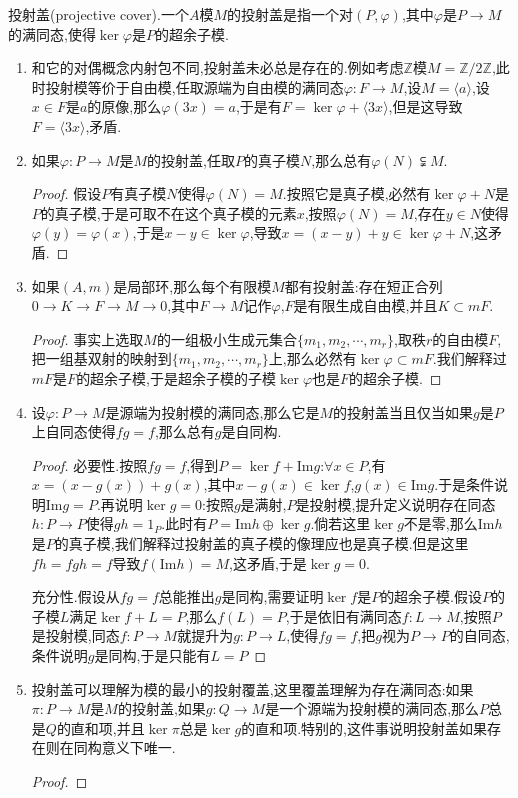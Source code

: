投射盖(projective cover).一个$A$模$M$的投射盖是指一个对$(P,\varphi)$,其中$\varphi$是$P\to M$的满同态,使得$\ker\varphi$是$P$的超余子模.
\begin{enumerate}
	\item 和它的对偶概念内射包不同,投射盖未必总是存在的.例如考虑$\mathbb{Z}$模$M=\mathbb{Z}/2\mathbb{Z}$,此时投射模等价于自由模,任取源端为自由模的满同态$\varphi:F\to M$,设$M=\langle a\rangle$,设$x\in F$是$a$的原像,那么$\varphi(3x)=a$,于是有$F=\ker\varphi+\langle 3x\rangle$,但是这导致$F=\langle 3x\rangle$,矛盾.
	\item 如果$\varphi:P\to M$是$M$的投射盖,任取$P$的真子模$N$,那么总有$\varphi(N)\subsetneqq M$.
	\begin{proof}
		
		假设$P$有真子模$N$使得$\varphi(N)=M$.按照它是真子模,必然有$\ker\varphi+N$是$P$的真子模,于是可取不在这个真子模的元素$x$,按照$\varphi(N)=M$,存在$y\in N$使得$\varphi(y)=\varphi(x)$,于是$x-y\in\ker\varphi$,导致$x=(x-y)+y\in\ker\varphi+N$,这矛盾.
	\end{proof}
	\item 如果$(A,m)$是局部环,那么每个有限模$M$都有投射盖:存在短正合列$0\to K\to F\to M\to0$,其中$F\to M$记作$\varphi$,$F$是有限生成自由模,并且$K\subset mF$.
	\begin{proof}
		
		事实上选取$M$的一组极小生成元集合$\{m_1,m_2,\cdots,m_r\}$,取秩$r$的自由模$F$,把一组基双射的映射到$\{m_1,m_2,\cdots,m_r\}$上,那么必然有$\ker\varphi\subset mF$.我们解释过$mF$是$F$的超余子模,于是超余子模的子模$\ker\varphi$也是$F$的超余子模.
	\end{proof}
    \item 设$\varphi:P\to M$是源端为投射模的满同态,那么它是$M$的投射盖当且仅当如果$g$是$P$上自同态使得$fg=f$,那么总有$g$是自同构.
    \begin{proof}
    	
    	必要性.按照$fg=f$,得到$P=\ker f+\mathrm{Im}g$:$\forall x\in P$,有$x=(x-g(x))+g(x)$,其中$x-g(x)\in\ker f$,$g(x)\in\mathrm{Im}g$.于是条件说明$\mathrm{Im}g=P$.再说明$\ker g=0$:按照$g$是满射,$P$是投射模,提升定义说明存在同态$h:P\to P$使得$gh=1_P$.此时有$P=\mathrm{Im}h\oplus\ker g$.倘若这里$\ker g$不是零,那么$\mathrm{Im}h$是$P$的真子模,我们解释过投射盖的真子模的像理应也是真子模.但是这里$fh=fgh=f$导致$f(\mathrm{Im}h)=M$,这矛盾,于是$\ker g=0$.
    	
    	充分性.假设从$fg=f$总能推出$g$是同构,需要证明$\ker f$是$P$的超余子模.假设$P$的子模$L$满足$\ker f+L=P$,那么$f(L)=P$,于是依旧有满同态$f:L\to M$,按照$P$是投射模,同态$f:P\to M$就提升为$g:P\to L$,使得$fg=f$,把$g$视为$P\to P$的自同态,条件说明$g$是同构,于是只能有$L=P$
    \end{proof}
    \item 投射盖可以理解为模的最小的投射覆盖,这里覆盖理解为存在满同态:如果$\pi:P\to M$是$M$的投射盖,如果$g:Q\to M$是一个源端为投射模的满同态,那么$P$总是$Q$的直和项,并且$\ker\pi$总是$\ker g$的直和项.特别的,这件事说明投射盖如果存在则在同构意义下唯一.
    \begin{proof}
    	

\end{proof}
\end{enumerate}
